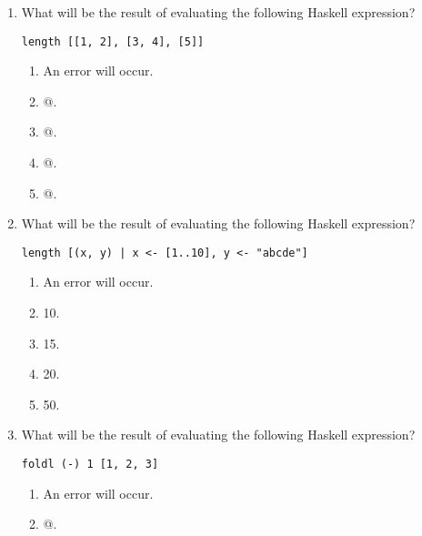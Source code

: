 \documentclass[12pt]{article}
\begin{document}
\begin{enumerate}

\item What will be the result of evaluating the following Haskell expression?

\begin{verbatim}
length [[1, 2], [3, 4], [5]]
\end{verbatim}

\begin{enumerate}

\item An error will occur.
\item {}@.  
\item {}@.  
\item {}@.  
\item {}@.  
  
\end{enumerate}

\newpage

\item What will be the result of evaluating the following Haskell expression?

\begin{verbatim}
length [(x, y) | x <- [1..10], y <- "abcde"]  
\end{verbatim}

\begin{enumerate}

\item An error will occur.

\item 10.

\item 15.

\item 20.

\item 50.  

\end{enumerate}


\item What will be the result of evaluating the following Haskell expression?

\begin{verbatim}
foldl (-) 1 [1, 2, 3]
\end{verbatim}

\begin{enumerate}
\item An error will occur.

\item {}@.


\end{enumerate}
\end{enumerate}
\end{document}
